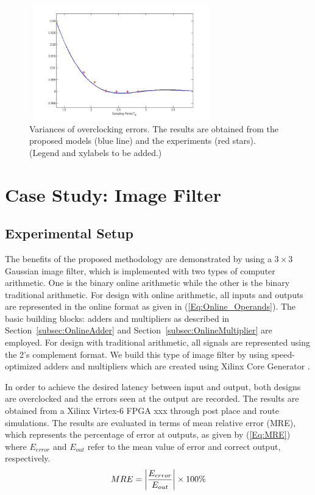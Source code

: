 \documentclass[journal]{IEEEtran}
\begin{document}
\begin{figure}[tbp]
\centering
  \includegraphics[width=8cm,height=5cm]{./Figures/Error_Function_Spline_experiment}
  \caption{Variances of overclocking errors. The results are obtained from the proposed models (blue line) and the experiments (red stars). (Legend and xylabels to be added.) }\label{Error_Function_Spline_experiment}
\end{figure}




\section{Case Study: Image Filter}\label{Sec:CaseStudy}
\subsection{Experimental Setup}
The benefits of the proposed methodology are demonstrated by using a $3\times3$ Gaussian image filter, which is implemented with two types of computer arithmetic. One is the binary online arithmetic while the other is the binary traditional arithmetic. For design with online arithmetic, all inputs and outputs are represented in the online format as given in (\ref{Eq:Online_Operands}). The basic building blocks: adders and multipliers as described in Section~\ref{subsec:OnlineAdder} and Section~\ref{subsec:OnlineMultiplier} are employed. For design with traditional arithmetic, all signals are represented using the 2's complement format. We build this type of image filter by using speed-optimized adders and multipliers which are created using Xilinx Core Generator \cite{XilinxMult}. 

In order to achieve the desired latency between input and output, both designs are overclocked and the errors seen at the output are recorded. The results are obtained from a Xilinx Virtex-6 FPGA xxx through post place and route simulations. The results are evaluated in terms of mean relative error (MRE), which represents the percentage of error at outputs, as given by (\ref{Eq:MRE}) where $E_{error}$ and $E_{out}$ refer to the mean value of error and correct output, respectively.
%
\begin{eqnarray}\label{Eq:MRE}
\scriptsize
  MRE=\left|\frac{E_{error}}{E_{out}}\right|\times100\%
\end{eqnarray}
\normalsize
\end{document}
